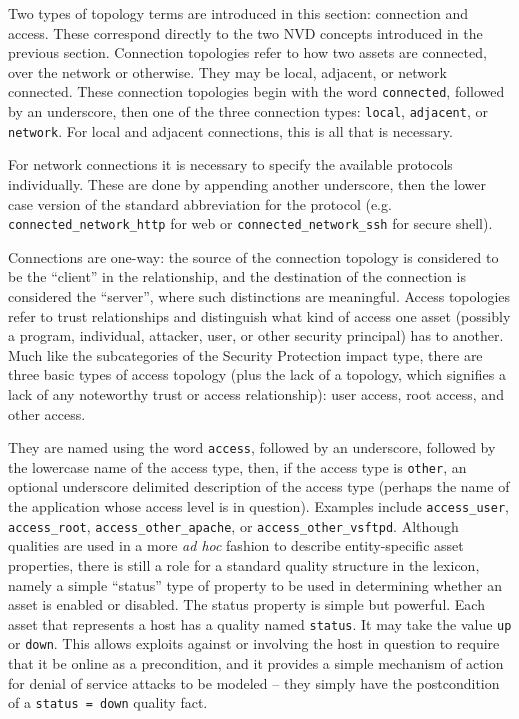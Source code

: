 Two types of topology terms are introduced in this section: connection and access. These
correspond directly to the two NVD concepts introduced in the previous section.
Connection topologies refer to how two assets are connected, over the network or otherwise.
They may be local, adjacent, or network connected. These connection topologies begin with
the word \texttt{connected}, followed by an underscore, then one of the three connection
types: \texttt{local}, \texttt{adjacent}, or \texttt{network}. For local and adjacent
connections, this is all that is necessary. 

For network connections it is
necessary to specify the available protocols individually. These are done by appending another
underscore, then the lower case version of the standard abbreviation for the protocol
(e.g. \texttt{connected\_network\_http} for web or \texttt{connected\_network\_ssh} for
secure shell).

Connections are one-way: the source of the connection topology is considered to be the
``client'' in the relationship, and the destination of the connection is considered
the ``server'', where such distinctions are meaningful.
Access topologies refer to trust relationships and distinguish what kind of access one
asset (possibly a program, individual, attacker, user, or other security principal) has
to another. Much like the subcategories of the Security Protection impact type,
there are three basic types of access topology (plus the lack of a topology, which
signifies a lack of any noteworthy trust or access relationship): user access,
root access, and other access.

They are named using the word \texttt{access}, followed by an underscore, followed
by the lowercase name of the access type, then, if the access type is \texttt{other},
an optional underscore delimited description of the access type (perhaps the name
of the application whose access level is in question). Examples include
\texttt{access\_user}, \texttt{access\_root}, \texttt{access\_other\_apache}, or
\texttt{access\_other\_vsftpd}.
Although qualities are used in a more \emph{ad hoc} fashion to describe entity-specific
asset properties, there is still a role for a standard quality structure in the
lexicon, namely a simple ``status'' type of property to be used in determining
whether an asset is enabled or disabled.
The status property is simple but powerful. Each asset that represents a host has a
quality named \texttt{status}. It may take the value \texttt{up} or \texttt{down}.
This allows exploits against or involving the host in question to require that it
be online as a precondition, and it provides a simple mechanism of action for
denial of service attacks to be modeled -- they simply have the postcondition of
a \texttt{status = down} quality fact.

